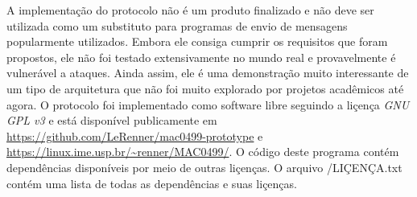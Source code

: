 A implementação do protocolo não é um produto finalizado e não deve ser utilizada como um substituto para programas de envio de mensagens popularmente utilizados. Embora ele consiga cumprir os requisitos que foram propostos, ele não foi testado extensivamente no mundo real e provavelmente é vulnerável a ataques. Ainda assim, ele é uma demonstração muito interessante de um tipo de arquitetura que não foi muito explorado por projetos acadêmicos até agora. O protocolo foi implementado como software libre seguindo a liçença \textit{GNU GPL v3} e está disponível publicamente em \url{https://github.com/LeRenner/mac0499-prototype} e \url{https://linux.ime.usp.br/~renner/MAC0499/}. O código deste programa contém dependências disponíveis por meio de outras liçenças. O arquivo /LIÇENÇA.txt contém uma lista de todas as dependências e suas liçenças.